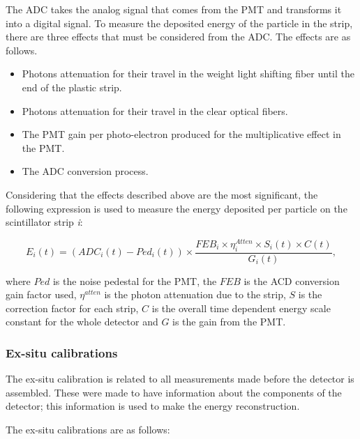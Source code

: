 The ADC takes the analog signal that comes from the PMT and transforms it into a digital signal. To measure the deposited energy of the particle in the strip, there are three effects that must be considered from the ADC. The effects are as follows.

\begin{itemize}
    \item Photons attenuation for their travel in the weight light shifting fiber until the end of the plastic strip. 
    \item Photons attenuation for their travel in the clear optical fibers.
    \item The PMT gain per photo-electron produced for the multiplicative effect in the PMT. 
    \item The ADC conversion process. 
\end{itemize}

Considering that the effects described above are the most significant, the following expression is used to measure the energy deposited per particle on the scintillator strip \textit{i}: 

\begin{equation}
    E_i(t) = (ADC_i(t) - Ped_i(t)) \times \frac{FEB_i \times \eta^{Atten}_i \times S_i(t) \times C(t)}{G_i(t)},
    \label{eq:DepositedEnergy}
\end{equation}

where $Ped$ is the noise pedestal for the PMT, the $FEB$ is the ACD conversion gain factor used, $\eta^{atten}$ is the photon attenuation due to the strip, $S$ is the correction factor for each strip, $C$ is the overall time dependent energy scale constant for the whole detector and $G$ is the gain from the PMT.

\subsubsection{Ex-situ calibrations}
\label{Cap:MnvExp:MnvDetector:Calibration:ExSitu}
The ex-situ calibration is related to all measurements made before the detector is assembled. These were made to have information about the components of the detector; this information is used to make the energy reconstruction. 

The ex-situ calibrations are as follows:

